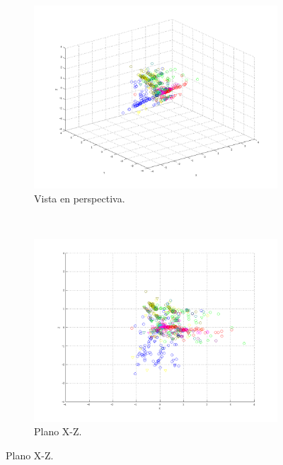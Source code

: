 \documentclass[informe.tex]{subfiles}
\begin{document}
      
	\begin{figure}[H]
        \centering
        \hspace*{-6.5cm}
        \begin{subfigure}[b]{0.49\textwidth}
                \includegraphics[width=\textwidth]{graficos/fold6_criterioParadap_reglaM_alpha0_rep3_0P.png}
                \caption{Vista en perspectiva.}
        \end{subfigure}%
        ~
        \begin{subfigure}[b]{0.49\textwidth}
                \includegraphics[width=\textwidth]{graficos/fold6_criterioParadap_reglaM_alpha0_rep3_1XZ.png}
                \caption{Plano X-Z.}
        \end{subfigure}
        

\end{figure}
\end{document}
